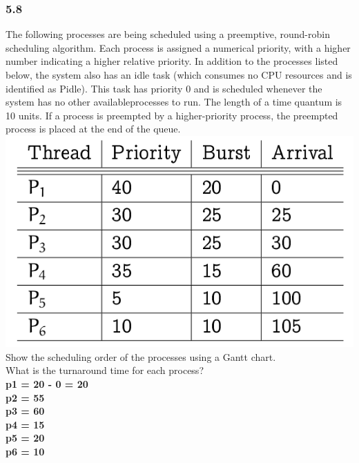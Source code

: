 \documentclass[a4paper,10pt,titlepage]{report}
\begin{document}
\subsubsection{5.8}
The following processes are being scheduled using a preemptive, round-robin scheduling algorithm. Each process is assigned a numerical priority, with a higher number indicating a higher relative priority. In addition to the processes listed below, the system also has an idle task (which consumes no CPU resources and is identified as Pidle). This task has priority 0 and is scheduled whenever the system has no other availableprocesses to run. The length of a time quantum is 10 units. If a process is preempted by a higher-priority process, the preempted process is placed at the end of the queue. 
\includegraphics[scale=0.5]{ex-5_8.png} \\
Show the scheduling order of the processes using a Gantt chart.\\
\hspace{10mm}What is the turnaround time for each process?\\
 \textbf{
\hspace{20mm} p1 = 20 - 0 = 20\\
\hspace{20mm} p2 = 55 \\
\hspace{20mm} p3 = 60 \\
\hspace{20mm} p4 = 15 \\
\hspace{20mm} p5 = 20 \\
\hspace{20mm} p6 = 10 \\
} 
\end{document}

